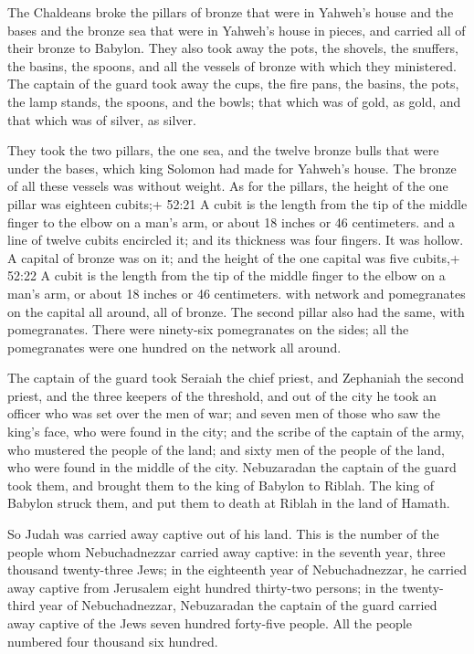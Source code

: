  The Chaldeans broke the pillars of bronze that were in
Yahweh's house and the bases and the bronze sea that were in Yahweh's
house in pieces, and carried all of their bronze to Babylon.
 They also took away the pots, the shovels, the snuffers,
the basins, the spoons, and all the vessels of bronze with which they
ministered.  The captain of the guard took away the cups,
the fire pans, the basins, the pots, the lamp stands, the spoons, and
the bowls; that which was of gold, as gold, and that which was of
silver, as silver.

 They took the two pillars, the one sea, and the twelve
bronze bulls that were under the bases, which king Solomon had made for
Yahweh's house. The bronze of all these vessels was without weight.
 As for the pillars, the height of the one pillar was
eighteen cubits;+ 52:21 A cubit is the length from the tip of the middle
finger to the elbow on a man's arm, or about 18 inches or 46
centimeters. and a line of twelve cubits encircled it; and its thickness
was four fingers. It was hollow.  A capital of bronze was
on it; and the height of the one capital was five cubits,+ 52:22 A cubit
is the length from the tip of the middle finger to the elbow on a man's
arm, or about 18 inches or 46 centimeters. with network and pomegranates
on the capital all around, all of bronze. The second pillar also had the
same, with pomegranates.  There were ninety-six
pomegranates on the sides; all the pomegranates were one hundred on the
network all around.

 The captain of the guard took Seraiah the chief priest,
and Zephaniah the second priest, and the three keepers of the threshold,
 and out of the city he took an officer who was set over
the men of war; and seven men of those who saw the king's face, who were
found in the city; and the scribe of the captain of the army, who
mustered the people of the land; and sixty men of the people of the
land, who were found in the middle of the city. 
Nebuzaradan the captain of the guard took them, and brought them to the
king of Babylon to Riblah.  The king of Babylon struck
them, and put them to death at Riblah in the land of Hamath.

So Judah was carried away captive out of his land.  This is
the number of the people whom Nebuchadnezzar carried away captive: in
the seventh year, three thousand twenty-three Jews;  in the
eighteenth year of Nebuchadnezzar, he carried away captive from
Jerusalem eight hundred thirty-two persons;  in the
twenty-third year of Nebuchadnezzar, Nebuzaradan the captain of the
guard carried away captive of the Jews seven hundred forty-five people.
All the people numbered four thousand six hundred.

